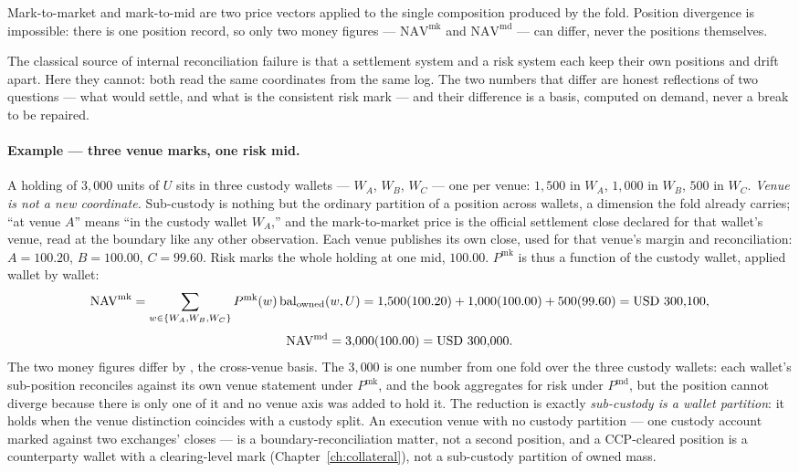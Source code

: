 \begin{principle}
Mark-to-market and mark-to-mid are two price vectors applied to the single
composition produced by the fold. Position divergence is impossible: there is
one position record, so only two money figures --- $\mathrm{NAV}^{\mathrm{mk}}$
and $\mathrm{NAV}^{\mathrm{md}}$ --- can differ, never the positions
themselves.
\end{principle}

The classical source of internal reconciliation failure is that a settlement
system and a risk system each keep their own positions and drift apart. Here
they cannot: both read the same coordinates from the same log. The two numbers
that differ are honest reflections of two questions --- what would settle, and
what is the consistent risk mark --- and their difference is a basis, computed
on demand, never a break to be repaired.

\paragraph{Example --- three venue marks, one risk mid.}
A holding of $3{,}000$ units of $U$ sits in three custody wallets --- $W_A$,
$W_B$, $W_C$ --- one per venue: $1{,}500$ in $W_A$, $1{,}000$ in $W_B$, $500$ in
$W_C$. \emph{Venue is not a new coordinate.} Sub-custody is nothing but the
ordinary partition of a position across wallets, a dimension the fold already
carries; ``at venue $A$'' means ``in the custody wallet $W_A$,'' and the
mark-to-market price is the official settlement close declared for that wallet's
venue, read at the boundary like any other observation. Each venue publishes its
own close, used for that venue's margin and reconciliation: $A = 100.20$, $B =
100.00$, $C = 99.60$. Risk marks the whole holding at one mid, $100.00$. $P^{\mathrm{mk}}$
is thus a function of the custody wallet, applied wallet by wallet:
\[
  \mathrm{NAV}^{\mathrm{mk}} = \sum_{w\in\{W_A,W_B,W_C\}} P^{\mathrm{mk}}(w)\,\mathrm{bal}_{\mathrm{owned}}(w,U)
    = 1{,}500(100.20) + 1{,}000(100.00) + 500(99.60) = \mbox{USD~300,100},
\]
\[
  \mathrm{NAV}^{\mathrm{md}} = 3{,}000(100.00) = \mbox{USD~300,000}.
\]
The two money figures differ by , the cross-venue basis. The
$3{,}000$ is one number from one fold over the three custody wallets: each
wallet's sub-position reconciles against its own venue statement under
$P^{\mathrm{mk}}$, and the book aggregates for risk under $P^{\mathrm{md}}$, but
the position cannot diverge because there is only one of it and no venue axis was
added to hold it. The reduction is exactly \emph{sub-custody is a wallet partition}:
it holds when the venue distinction coincides with a custody split. An execution
venue with no custody partition --- one custody account marked against two exchanges'
closes --- is a boundary-reconciliation matter, not a second position, and a
CCP-cleared position is a counterparty wallet with a clearing-level mark
(Chapter~\ref{ch:collateral}), not a sub-custody partition of owned mass.

